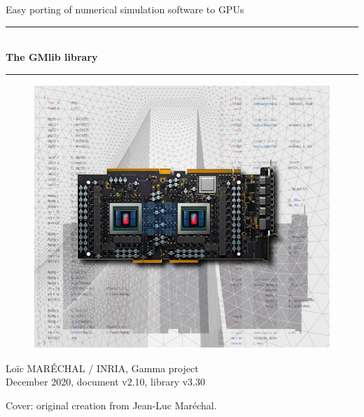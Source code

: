 \documentclass[a4paper,12pt]{article}
\newcommand{\HRule}{\rule{\linewidth}{1mm}}
\begin{document}
%
%

\begin{titlepage}

\begin{center}
\huge Easy porting of numerical simulation software to GPUs
\HRule \\
\medskip
{\Huge \bfseries The GMlib library} \\
\HRule
\end{center}

\begin{figure}[htbp]
\begin{center}
\includegraphics[width=15cm]{gpu.jpg}
\end{center}
\end{figure}

\begin{flushright}
\Large Lo\"ic MAR\'ECHAL / INRIA, Gamma project \\
\normalsize December 2020, document v2.10, library v3.30
\end{flushright}

\end{titlepage}

\clearpage

\setcounter{tocdepth}{2}
\renewcommand*\contentsname{Summary}
\tableofcontents
\vfill

\footnotesize{Cover: original creation from Jean-Luc Maréchal.}
\normalsize

\clearpage
\end{document}
